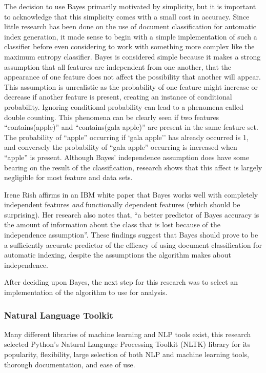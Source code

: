 The decision to use \naive Bayes primarily motivated by simplicity, but it is important to acknowledge that this simplicity comes with a small cost in accuracy.
Since little research has been done on the use of document classification for automatic index generation, it made sense to begin with a simple implementation of such a classifier before even considering to work with something more complex like the maximum entropy classifier.
\Naive Bayes is considered simple because it makes a strong assumption that all features are independent from one another, that the appearance of one feature does not affect the possibility that another will appear.
This assumption is unrealistic as the probability of one feature might increase or decrease if another feature is present, creating an instance of conditional probability.
Ignoring conditional probability can lead to a phenomena called double counting.
This phenomena can be clearly seen if two features ``contains(apple)'' and ``contains(gala apple)'' are present in the same feature set.
The probability of ``apple'' occurring if `gala apple'' has already occurred is 1, and conversely the probability of ``gala apple'' occurring is increased when ``apple'' is present.
Although \naive Bayes' independence assumption does have some bearing on the result of the classification, research shows that this affect is largely negligible for most feature and data sets.

Irene Rish affirms in an IBM white paper that \naive Bayes works well with completely independent features {\it and} functionally dependent features (which should be surprising).
Her research also notes that, ``a better predictor of \naive Bayes accuracy is the amount of information about the class that is lost because of the independence assumption''\cite{rish}.
These findings suggest that \naive Bayes should prove to be a sufficiently accurate predictor of the efficacy of using document classification for automatic indexing, despite the assumptions the algorithm makes about independence.

After deciding upon \naive Bayes, the next step for this research was to select an implementation of the algorithm to use for analysis.

\subsubsection{Natural Language Toolkit}
\label{sec:nltk}

Many different libraries of machine learning and NLP tools\cite{stanford-nlp,open-nlp} exist, this research selected Python's Natural Language Processing Toolkit (NLTK) library\cite{nltk} for its popularity, flexibility, large selection of both NLP and machine learning tools, thorough documentation, and ease of use.

